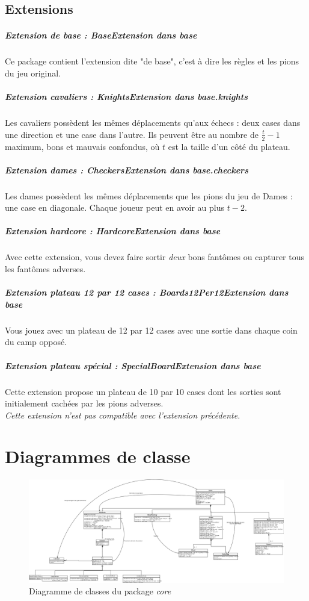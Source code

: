 \documentclass[]{report}
\begin{document}
\subsection{Extensions}
\subparagraph{Extension de base : \textit{BaseExtension} dans \textit{base}}
Ce package contient l'extension dite "de base", c'est à dire les règles et les pions du jeu original.

\subparagraph{Extension cavaliers : \textit{KnightsExtension} dans \textit{base.knights}}
Les cavaliers possèdent les mêmes déplacements qu'aux échecs : deux cases dans une direction et une case dans l'autre. Ils peuvent être au nombre de $\frac{t}{2}-1$ maximum, bons et mauvais confondus, où $t$ est la taille d'un côté du plateau.

\subparagraph{Extension dames : \textit{CheckersExtension} dans \textit{base.checkers}}
Les dames possèdent les mêmes déplacements que les pions du jeu de Dames : une case en diagonale. Chaque joueur peut en avoir au plus $t - 2$.

\subparagraph{Extension hardcore : \textit{HardcoreExtension} dans \textit{base}}
Avec cette extension, vous devez faire sortir \emph{deux} bons fantômes ou capturer tous les fantômes adverses.

\subparagraph{Extension plateau 12 par 12 cases : \textit{Boards12Per12Extension} dans \textit{base}}
Vous jouez avec un plateau de 12 par 12 cases avec une sortie dans chaque coin du camp opposé.

\subparagraph{Extension plateau spécial : \textit{SpecialBoardExtension} dans \textit{base}}
Cette extension propose un plateau de 10 par 10 cases dont les sorties sont initialement cachées par les pions adverses.\\
\emph{Cette extension n'est pas compatible avec l'extension précédente.}

\section{Diagrammes de classe}

\begin{figure}[!h]
	\caption{Diagramme de classes du package \textit{core}}
	\includegraphics[width=\textwidth]{core.png}
\end{figure}
\end{document}
